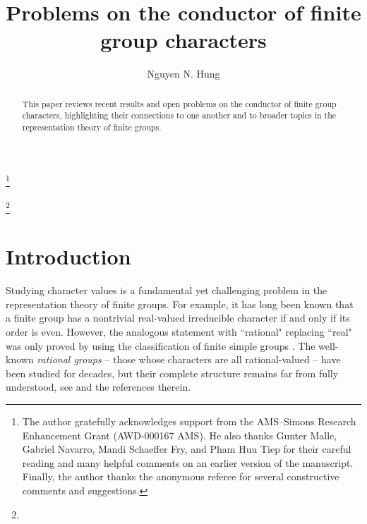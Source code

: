 \documentclass[12pt]{amsart}
\theoremstyle{definition}
\numberwithin{equation}{section}
\begin{document}
\title[Problems on character conductors]
{Problems on the conductor of finite group characters}



\author[Nguyen N. Hung]{Nguyen N. Hung}
\address{Department of Mathematics, The University of Akron, Akron,
OH 44325, USA}


\thanks{The author gratefully acknowledges support from the AMS--Simons Research
Enhancement Grant (AWD-000167 AMS). He also thanks Gunter Malle,
Gabriel Navarro, Mandi Schaeffer Fry, and Pham Huu Tiep for their
careful reading and many helpful comments on an earlier version of
the manuscript. Finally, the author thanks the anonymous referee for
several constructive comments and suggestions.}



%


\thanks{}

\begin{abstract} This paper reviews recent results and open problems on the conductor of finite group characters,
highlighting their connections to one another and to broader topics
in the representation theory of finite groups.
\end{abstract}

\maketitle

\tableofcontents


\section{Introduction}

Studying character values is a fundamental yet challenging problem
in the representation theory of finite groups. For example, it has
long been known that a finite group has a nontrivial real-valued
irreducible character if and only if its order is even. However, the
analogous statement with ``rational" replacing ``real" was only
proved by using the classification of finite simple groups
\cite{Navarro-Tiep08}. The well-known \emph{rational groups} --
those whose characters are all rational-valued -- have been studied
for decades, but their complete structure remains far from fully
understood, see \cite{Thompson08} and the references therein.
\end{document}
